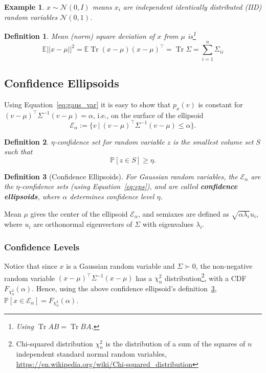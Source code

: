 \documentclass{article}[12pt]
\def\Eps{\mathcal{E}}
\def\E{\E}
\def\P{\mathbb{P}}
\def \E{\mathbb E}
\def \P{\mathbb P}
\DeclareMathOperator{\Tr}{Tr}
\newtheorem{definition}{Definition}
\newtheorem{example}{Example}
\begin{document}
\begin{example}
$x\sim\mathcal{N}(0,I)$ means $x_i$ are independent identically distributed (IID) random variables $\mathcal{N}(0,1)$. 
\end{example}

\begin{definition}
	Mean (norm) square deviation of $x$ from $\mu$ is\footnote{Using $\Tr AB = \Tr BA$.}
	\begin{equation}
	\E ||x-\mu||^2 = \E \Tr(x-\mu)(x-\mu)^\top = \Tr \Sigma = \sum\limits_{i=1}^{n} \Sigma_{ii}
	\end{equation}
\end{definition}

\subsection{Confidence Ellipsoids}
Using Equation~\eqref{eq:gaus_var} it is easy to show that $p_x(v)$ is constant for $(v-\mu)^\top \Sigma^{-1} (v-\mu)=\alpha$, i.e., on the surface of the ellipsoid
\begin{equation}
\label{eq:eps}
\Eps_\alpha := \{v\ |\ (v-\mu)^\top \Sigma^{-1} (v-\mu)\leq \alpha\}.
\end{equation}
\begin{definition}
$\eta$-confidence set for random variable $z$ is  the smallest volume set $S$ such that
\begin{equation}
\P\left[z\in S\right]\geq \eta.
\end{equation} 
\end{definition}
\begin{definition}[Confidence Ellipsoids]
	\label{def:conf_el}
	For Gaussian random variables, the $\Eps_\alpha$ are the $\eta$-confidence sets (using Equation~\eqref{eq:eps}), and are called \textbf{confidence ellipsoids}, where $\alpha$ determines confidence level $\eta$.
\end{definition}
Mean $\mu$ gives the center of the ellipsoid $\Eps_\alpha$, and semiaxes are defined as $\sqrt{\alpha \lambda_i}u_i$, where $u_i$ are orthonormal eigenvectors of $\Sigma$ with eigenvalues $\lambda_i$. 

\subsubsection{Confidence Levels}
Notice that since $x$ is a Gaussian random variable and $\Sigma\succ 0$, the non-negative random variable $(x-\mu)^\top \Sigma^{-1} (x-\mu)$ has a $\chi_n^2$ distribution\footnote{Chi-squared distribution $\chi_n^2$ is the distribution of a sum of the squares of $n$ independent standard normal random variables,  \url{https://en.wikipedia.org/wiki/Chi-squared_distribution}}, with a CDF $F_{\chi_n^2}(\alpha)$. Hence, using the above confidence ellipsoid's definition~\ref{def:conf_el},  $\mathbb{P}\left[x\in\Eps_\alpha\right]=F_{\chi_n^2}(\alpha)$.
\end{document}
